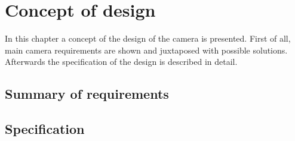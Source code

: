\chapter{Concept of design}
In this chapter a concept of the design of the camera is presented. First of all, main camera requirements are shown and juxtaposed with possible solutions. Afterwards the specification of the design is described in detail.

\section{Summary of requirements}
\section{Specification}

